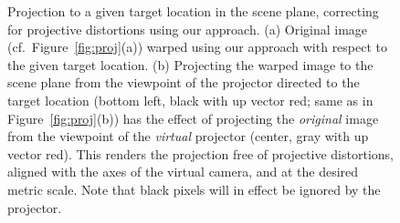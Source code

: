 \documentclass[review]{elsarticle}
\begin{document}
\begin{figure}
    \centering
    \qquad
    \caption{Projection to a given target location in the scene plane, correcting for projective distortions using our approach. (a) Original image (cf.\ Figure~\ref{fig:proj}(a)) warped using our approach with respect to the given target location. (b) Projecting the warped image to the scene plane from the viewpoint of the projector directed to the target location (bottom left, black with up vector red; same as in Figure~\ref{fig:proj}(b)) has the effect of projecting the \textit{original} image from the viewpoint of the \textit{virtual} projector (center, gray with up vector red). This renders the projection free of projective distortions, aligned with the axes of the virtual camera, and at the desired metric scale. Note that black pixels will in effect be ignored by the projector.}
    \label{fig:warp}
\end{figure}
\end{document}
